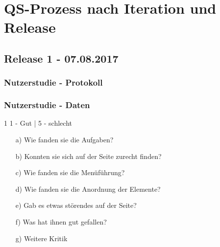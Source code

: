 \documentclass[accentcolor=tud0b,12pt,paper=a4]{tudreport}
\begin{document}
\chapter{QS-Prozess nach Iteration und Release}














\pagebreak
\section{Release 1 - 07.08.2017}

	\subsection*{Nutzerstudie - Protokoll}
	
	
	\subsection*{Nutzerstudie - Daten}
	\begin{adjustbox}{max width=\textwidth}
	\end{adjustbox}
	\begin{footnotesize} 1 1 - Gut | 5 - schlecht \end{footnotesize}
	\begin{itemize}
		\item[a)] Wie fanden sie die Aufgaben?
		\item[b)] Konnten sie sich auf der Seite zurecht finden?
		\item[c)] Wie fanden sie die Menüführung?
		\item[d)] Wie fanden sie die Anordnung der Elemente?
		\item[e)] Gab es etwas störendes auf der Seite?
		\item[f)] Was hat ihnen gut gefallen?
		\item[g)] Weitere Kritik
	\end{itemize}
\end{document}
